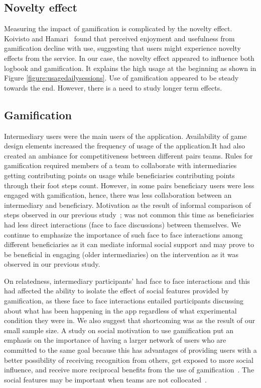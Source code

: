 \documentclass{sig-alternate}
\begin{document}
\subsection*{\textbf{Novelty effect}}
Measuring the impact of gamification is complicated by the novelty effect. Koivisto and Hamari~\cite{koivisto2014demographic} found that perceived enjoyment and usefulness from gamification decline with use, suggesting that users might experience novelty effects from the service. In our case, the novelty effect appeared to influence both logbook and gamification. It explains the high usage at the beginning as shown in Figure \ref{figure:usagedailysessions}. Use of gamification appeared to be steady towards the end. However, there is a need to study longer term effects.

\subsection*{\textbf{Gamification}} 
Intermediary users were the main users of the application. Availability of game design elements increased the frequency of usage of the application.It had also created an ambiance for competitiveness between different pairs teams. Rules for gamification required members of a team to collaborate with intermediaries getting contributing points on usage while beneficiaries contributing points through their foot steps count. However, in some pairs beneficiary users were less engaged with gamification, hence, there was less collaboration between an intermediary and beneficiary. Motivation as the result of informal comparison of steps observed in our previous study~\cite{katule2016:leveraging}; was not common this time as beneficiaries had less direct interactions (face to face discussions) between themselves. We continue to emphasize the importance of such face to face interactions among different beneficiaries as it can mediate informal social support and may prove to be beneficial in engaging  (older intermediaries) on the intervention as it was observed in our previous study. 

On relatedness, intermediary participants' had face to face interactions and this had affected the ability to isolate the effect of social features provided by gamification, as these face to face interactions entailed participants discussing about what has been happening in the app regardless of what experimental condition they were in. We also suggest that shortcoming was as the result of our small sample size. A study on social motivation to use gamification put an emphasis on the importance of having a larger network of users who are committed to the same goal because this has advantages of providing users with a better possibility of receiving recognition from others, get exposed to more social influence, and receive more reciprocal benefits from the use of gamification~\cite{hamari2013social}. The social features may be important when teams are not collocated~\cite{lin2006:fish}.
\end{document}
